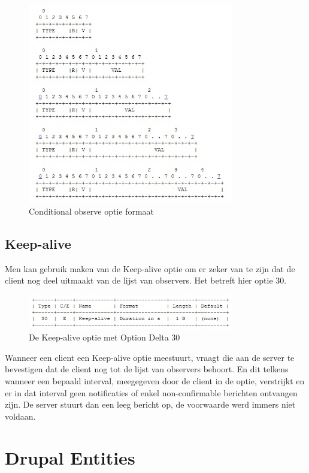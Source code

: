 \begin{figure}[h!]
\centering
\includegraphics[width=0.8\textwidth]{fig/conditional_format}
\caption{Conditional observe optie formaat}
\end{figure}

\subsection{Keep-alive}

Men kan gebruik maken van de Keep-alive optie om er zeker van te zijn dat de client nog deel uitmaakt van de lijst van observers. Het betreft hier optie 30.\\

\begin{figure}[h!]
\centering
\includegraphics[width=0.8\textwidth]{fig/keep_alive}
\caption{De Keep-alive optie met Option Delta 30}
\end{figure}

Wanneer een client een Keep-alive optie meestuurt, vraagt die aan de server te bevestigen dat de client nog tot de lijst van observers behoort. En dit telkens wanneer een bepaald interval,
meegegeven door de client in de optie, verstrijkt en er in dat interval geen notificaties of enkel non-confirmable berichten ontvangen zijn. De server stuurt dan een leeg bericht op, de
voorwaarde werd immers niet voldaan.

\section{Drupal Entities}